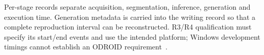 Per-stage records separate acquisition, segmentation, inference, generation and execution time. Generation metadata is carried into the writing record so that a complete reproduction interval can be reconstructed. R3/R4 qualification must specify its start/end events and use the intended platform; Windows development timings cannot establish an ODROID requirement~\cite[timing.py; web/server.py]{braunepipeline2026}.
\FloatBarrier
